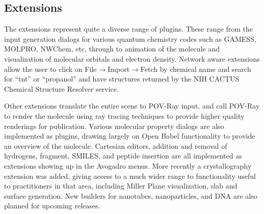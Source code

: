 \documentclass[10pt]{bmc_article}
\newenvironment{bmcformat}{\begin{raggedright}
\baselineskip20pt\sloppy\setboolean{publ}{false}}{\end{raggedright}
\baselineskip20pt\sloppy}
\begin{document}
\begin{bmcformat}
\subsection{Extensions}

The extensions represent quite a diverse range of plugins. These range from the
input generation dialogs for various quantum chemistry codes such as GAMESS,
MOLPRO, NWChem, etc, through to animation of the molecule and visualization of
molecular orbitals and electron density. Network aware extensions allow the user
to click on File$\to$Import$\to$Fetch by chemical name and search for ``tnt'' or
``propanol'' and have structures returned by the NIH CACTUS Chemical Structure
Resolver service.

Other extensions translate the entire scene to POV-Ray input, and call POV-Ray
to render the molecule using ray tracing techniques to provide higher quality
renderings for publication. Various molecular property dialogs are also
implemented as plugins, drawing largely on Open Babel functionality to provide
an overview of the molecule. Cartesian editors, addition and removal of
hydrogens, fragment, SMILES, and peptide insertion are all implemented as
extensions showing up in the Avogadro menus. More recently a crystallography
extension was added, giving access to a much wider range to functionality
useful to practitioners in that area, including Miller Plane
visualization, slab and surface generation. New builders for
nanotubes, nanoparticles, and DNA are also planned for upcoming releases.


\end{bmcformat}
\end{document}
